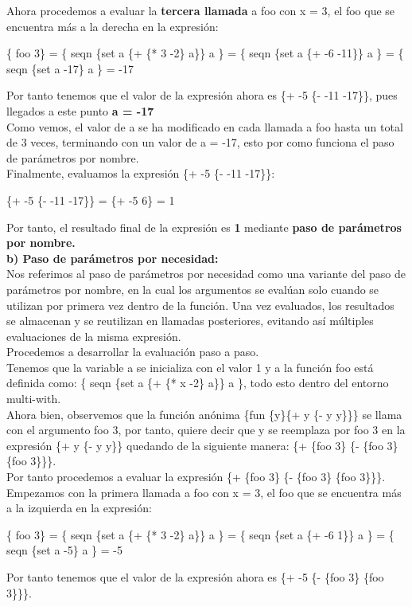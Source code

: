 \documentclass[11pt]{article}
\begin{document}
\begin{enumerate}[leftmargin=0.8cm]
    Ahora procedemos a evaluar la \textbf{tercera llamada} a foo con x = 3, el foo que se encuentra más a la derecha en la expresión:
    \begin{center}
        \{ foo 3\} = \{ seqn \{set a \{+ \{* 3 -2\} a\}\} a \} = \{ seqn \{set a \{+ -6 -11\}\} a \} = \{ seqn \{set a -17\} a \} = -17
    \end{center}
    Por tanto tenemos que el valor de la expresión ahora es \{+ -5 \{- -11 -17\}\}, pues llegados a este punto \textbf{a = -17} \\

    Como vemos, el valor de a se ha modificado en cada llamada a foo hasta un total de 3 veces, terminando con un valor de a = -17, esto por como funciona el paso de parámetros por nombre.\\

    Finalmente, evaluamos la expresión \{+ -5 \{- -11 -17\}\}:
    \begin{center}
        \{+ -5 \{- -11 -17\}\} = \{+ -5 6\} = 1
    \end{center}
    Por tanto, el resultado final de la expresión es \textbf{1} mediante \textbf{paso de parámetros por nombre.}\\


    \textbf{b) Paso de parámetros por necesidad:}\\
    Nos referimos al paso de parámetros por necesidad como una variante del paso de parámetros por nombre, en la cual los argumentos se evalúan solo cuando se utilizan por primera vez dentro de la función. Una vez evaluados, los resultados se almacenan y se reutilizan en llamadas posteriores, evitando así múltiples evaluaciones de la misma expresión.\\
    Procedemos a desarrollar la evaluación paso a paso.\\
    Tenemos que la variable a se inicializa con el valor 1 y a la función foo está definida como: \{ seqn \{set a \{+ \{* x -2\} a\}\} a \}, todo esto dentro del entorno multi-with.\\
    Ahora bien, observemos que la función anónima \{fun \{y\}\{+ y \{- y y\}\}\} se llama con el argumento foo 3, por tanto, quiere decir que y se reemplaza por foo 3 en la expresión \{+ y \{- y y\}\} quedando de la siguiente manera: \{+ \{foo 3\} \{- \{foo 3\} \{foo 3\}\}\}.\\
    Por tanto procedemos a evaluar la expresión \{+ \{foo 3\} \{- \{foo 3\} \{foo 3\}\}\}.\\
    Empezamos con la primera llamada a foo con x = 3, el foo que se encuentra más a la izquierda en la expresión:
    \begin{center}
        \{ foo 3\} = \{ seqn \{set a \{+ \{* 3 -2\} a\}\} a \} = \{ seqn \{set a \{+ -6 1\}\} a \} = \{ seqn \{set a -5\} a \} = -5
    \end{center}
    Por tanto tenemos que el valor de la expresión ahora es \{+ -5 \{- \{foo 3\} \{foo 3\}\}\}.\\


\end{enumerate}
\end{document}
